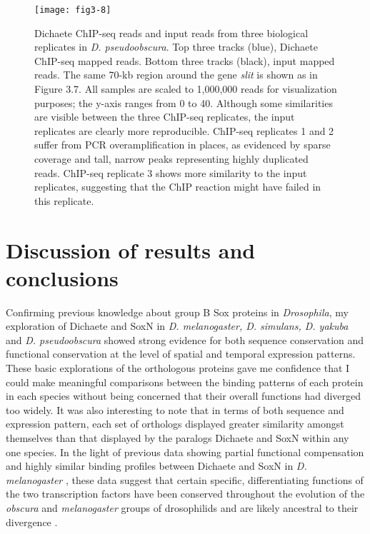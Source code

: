 \begin{figure}
\centering
\texttt{[image: fig3-8]}
\caption{Dichaete ChIP-seq reads and input reads from three biological replicates in \emph{D. pseudoobscura}. Top three tracks (blue), Dichaete ChIP-seq mapped reads. Bottom three tracks (black), input mapped reads. The same 70-kb region around the gene \emph{slit} is shown as in Figure 3.7. All samples are scaled to 1,000,000 reads for visualization purposes; the y-axis ranges from 0 to 40. Although some similarities are visible between the three ChIP-seq replicates, the input replicates are clearly more reproducible. ChIP-seq replicates 1 and 2 suffer from PCR overamplification in places, as evidenced by sparse coverage and tall, narrow peaks representing highly duplicated reads. ChIP-seq replicate 3 shows more similarity to the input replicates, suggesting that the ChIP reaction might have failed in this replicate.}
\label{Figure 3.8}
\end{figure}

\section{Discussion of results and conclusions}
Confirming previous knowledge about group B Sox proteins in \emph{Drosophila}, my exploration of Dichaete and SoxN in \emph{D. melanogaster, D. simulans, D. yakuba} and \emph{D. pseudoobscura} showed strong evidence for both sequence conservation and functional conservation at the level of spatial and temporal expression patterns. These basic explorations of the orthologous proteins gave me confidence that I could make meaningful comparisons between the binding patterns of each protein in each species without being concerned that their overall functions had diverged too widely. It was also interesting to note that in terms of both sequence and expression pattern, each set of orthologs displayed greater similarity amongst themselves than that displayed by the paralogs Dichaete and SoxN within any one species. In the light of previous data showing partial functional compensation and highly similar binding profiles between Dichaete and SoxN in \emph{D. melanogaster} \citep{ferrero_soxneuro_2014,overton_drosophila_2007}, these data suggest that certain specific, differentiating functions of the two transcription factors have been conserved throughout the evolution of the \emph{obscura} and \emph{melanogaster} groups of drosophilids and are likely ancestral to their divergence \citep{russo_molecular_1995}.\\

